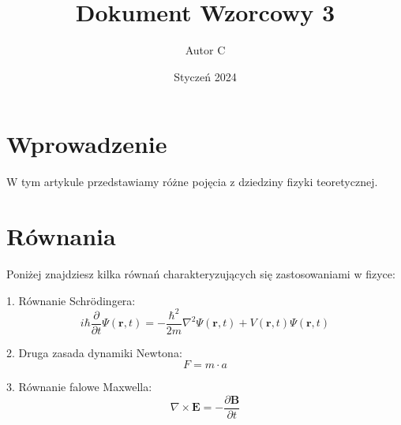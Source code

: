 \documentclass{article}
\title{Dokument Wzorcowy 3}
\author{Autor C}
\date{Styczeń 2024}
\begin{document}
\maketitle

\section{Wprowadzenie}

W tym artykule przedstawiamy różne pojęcia z dziedziny fizyki teoretycznej.

\section{Równania}

Poniżej znajdziesz kilka równań charakteryzujących się zastosowaniami w fizyce:

1. Równanie Schrödingera:
\[ i\hbar \frac{\partial}{\partial t} \Psi(\mathbf{r}, t) = -\frac{\hbar^2}{2m} \nabla^2 \Psi(\mathbf{r}, t) + V(\mathbf{r}, t) \Psi(\mathbf{r}, t) \]

2. Druga zasada dynamiki Newtona:
\[ F = m \cdot a \]

3. Równanie falowe Maxwella:
\[ \nabla \times \mathbf{E} = -\frac{\partial \mathbf{B}}{\partial t} \]
\end{document}
